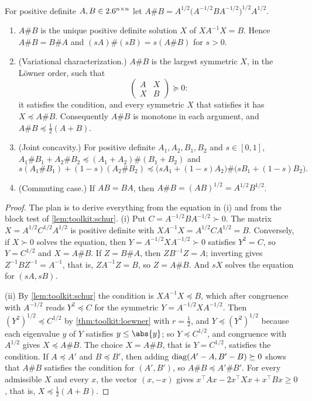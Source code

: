 \begin{refsection}
\begin{theorem}\label{thm:toolkit:geomean}
For positive definite $A,B\in2.6^{n\times n}$ let $A\#B=A^{1/2}\bigl(A^{-1/2}BA^{-1/2}\bigr)^{1/2}A^{1/2}$.
\begin{enumerate}
\item $A\#B$ is the unique positive definite solution $X$ of $XA^{-1}X=B$. Hence $A\#B=B\#A$ and $(sA)\#(sB)=s(A\#B)$ for $s>0$.
\item (Variational characterization.) $A\#B$ is the largest symmetric $X$, in the L\"owner order, such that
\[
  \begin{pmatrix}A&X\\X&B\end{pmatrix}\succeq0 :
\]
it satisfies the condition, and every symmetric $X$ that satisfies it has $X\preceq A\#B$. Consequently $A\#B$ is monotone in each argument, and $A\#B\preceq\frac12(A+B)$.
\item (Joint concavity.) For positive definite $A_1,A_2,B_1,B_2$ and $s\in[0,1]$, $A_1\#B_1+A_2\#B_2\preceq(A_1+A_2)\#(B_1+B_2)$ and
\[
  s(A_1\#B_1)+(1-s)(A_2\#B_2)\preceq\bigl(sA_1+(1-s)A_2\bigr)\#\bigl(sB_1+(1-s)B_2\bigr).
\]
\item (Commuting case.) If $AB=BA$, then $A\#B=(AB)^{1/2}=A^{1/2}B^{1/2}$.
\end{enumerate}
\end{theorem}

\begin{proof}
The plan is to derive everything from the equation in (i) and from the block test of \cref{lem:toolkit:schur}. (i) Put $C=A^{-1/2}BA^{-1/2}\succ0$. The matrix $X=A^{1/2}C^{1/2}A^{1/2}$ is positive definite with $XA^{-1}X=A^{1/2}CA^{1/2}=B$. Conversely, if $X\succ0$ solves the equation, then $Y=A^{-1/2}XA^{-1/2}\succ0$ satisfies $Y^2=C$, so $Y=C^{1/2}$ and $X=A\#B$. If $Z=B\#A$, then $ZB^{-1}Z=A$; inverting gives $Z^{-1}BZ^{-1}=A^{-1}$, that is, $ZA^{-1}Z=B$, so $Z=A\#B$. And $sX$ solves the equation for $(sA,sB)$.

(ii) By \cref{lem:toolkit:schur} the condition is $XA^{-1}X\preceq B$, which after congruence with $A^{-1/2}$ reads $Y^2\preceq C$ for the symmetric $Y=A^{-1/2}XA^{-1/2}$. Then $(Y^2)^{1/2}\preceq C^{1/2}$ by \cref{thm:toolkit:loewner} with $r=\frac12$, and $Y\preceq(Y^2)^{1/2}$ because each eigenvalue $y$ of $Y$ satisfies $y\le\abs{y}$; so $Y\preceq C^{1/2}$, and congruence with $A^{1/2}$ gives $X\preceq A\#B$. The choice $X=A\#B$, that is $Y=C^{1/2}$, satisfies the condition. If $A\preceq A'$ and $B\preceq B'$, then adding $\operatorname{diag}(A'-A,B'-B)\succeq0$ shows that $A\#B$ satisfies the condition for $(A',B')$, so $A\#B\preceq A'\#B'$. For every admissible $X$ and every $x$, the vector $(x,-x)$ gives $x^\top Ax-2x^\top Xx+x^\top Bx\ge0$, that is, $X\preceq\frac12(A+B)$.


\end{proof}
\end{refsection}
